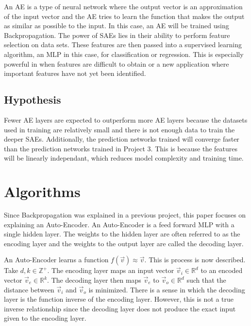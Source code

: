 \documentclass[twoside,11pt]{article}
\begin{document}
	An AE is a type of neural network where the output vector is an approximation of the input vector and the AE tries to learn the function that makes the output as similar as possible to the input. In this case, an AE will be trained using Backpropagation. The power of SAEs lies in their ability to perform feature selection on data sets. These features are then passed into a supervised learning algorithm, an MLP in this case, for classification or regression. This is especially powerful in when features are difficult to obtain or a new application where important features have not yet been identified. 
	
	

\subsection{Hypothesis}
	Fewer AE layers are expected to outperform more AE layers because the datasets used in training are relatively small and there is not enough data to train the deeper SAEs. Additionally, the prediction networks trained will converge faster than the prediction networks trained in Project 3. This is because the features will be linearly independant, which reduces model complexity and training time.
\section{Algorithms}

	Since Backpropagation was explained in a previous project, this paper focuses on explaining an Auto-Encoder. 
	An Auto-Encoder is a feed forward MLP with a single hidden layer. 
	The weights to the hidden layer are often referred to as the encoding layer and the weights to the output layer are called the decoding layer. 
	
	An Auto-Encoder learns a function $f(\vec{v}) \approx \vec{v}$. 
	This is process is now described.
	Take $d,k \in \mathbb{Z}^+$. 
	The encoding layer maps an input vector $\vec{v}_i \in \mathbb{R}^d$ to an encoded vector $\vec{v}_e \in \mathbb{R}^k$.
	The decoding layer then maps $\vec{v}_e$ to $\vec{v}_o \in \mathbb{R}^d$ such that the distance between $\vec{v}_i$ and $\vec{v}_o$ is minimized.
	There is a sense in which the decoding layer is the function inverse of the encoding layer. 
	However, this is not a true inverse relationship since the decoding layer does not produce the exact input given to the encoding layer.
	
\end{document}
